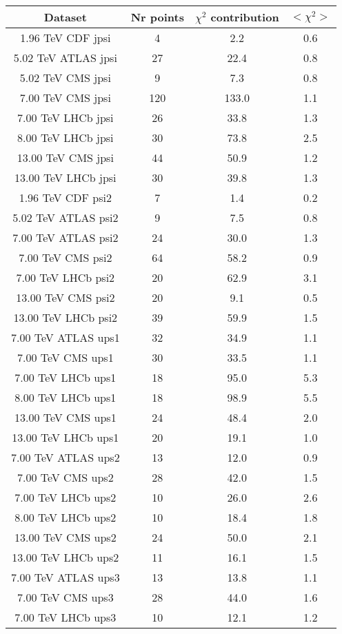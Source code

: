 \begin{table}[h!]
\centering
\begin{tabular}{c|c|c|c}
Dataset & Nr points & $\chi^2$ contribution & $<\chi^2>$ \\
\hline
1.96 TeV CDF jpsi & 4 & 2.2 & 0.6 \\
5.02 TeV ATLAS jpsi & 27 & 22.4 & 0.8 \\
5.02 TeV CMS jpsi & 9 & 7.3 & 0.8 \\
7.00 TeV CMS jpsi & 120 & 133.0 & 1.1 \\
7.00 TeV LHCb jpsi & 26 & 33.8 & 1.3 \\
8.00 TeV LHCb jpsi & 30 & 73.8 & 2.5 \\
13.00 TeV CMS jpsi & 44 & 50.9 & 1.2 \\
13.00 TeV LHCb jpsi & 30 & 39.8 & 1.3 \\
1.96 TeV CDF psi2 & 7 & 1.4 & 0.2 \\
5.02 TeV ATLAS psi2 & 9 & 7.5 & 0.8 \\
7.00 TeV ATLAS psi2 & 24 & 30.0 & 1.3 \\
7.00 TeV CMS psi2 & 64 & 58.2 & 0.9 \\
7.00 TeV LHCb psi2 & 20 & 62.9 & 3.1 \\
13.00 TeV CMS psi2 & 20 & 9.1 & 0.5 \\
13.00 TeV LHCb psi2 & 39 & 59.9 & 1.5 \\
7.00 TeV ATLAS ups1 & 32 & 34.9 & 1.1 \\
7.00 TeV CMS ups1 & 30 & 33.5 & 1.1 \\
7.00 TeV LHCb ups1 & 18 & 95.0 & 5.3 \\
8.00 TeV LHCb ups1 & 18 & 98.9 & 5.5 \\
13.00 TeV CMS ups1 & 24 & 48.4 & 2.0 \\
13.00 TeV LHCb ups1 & 20 & 19.1 & 1.0 \\
7.00 TeV ATLAS ups2 & 13 & 12.0 & 0.9 \\
7.00 TeV CMS ups2 & 28 & 42.0 & 1.5 \\
7.00 TeV LHCb ups2 & 10 & 26.0 & 2.6 \\
8.00 TeV LHCb ups2 & 10 & 18.4 & 1.8 \\
13.00 TeV CMS ups2 & 24 & 50.0 & 2.1 \\
13.00 TeV LHCb ups2 & 11 & 16.1 & 1.5 \\
7.00 TeV ATLAS ups3 & 13 & 13.8 & 1.1 \\
7.00 TeV CMS ups3 & 28 & 44.0 & 1.6 \\
7.00 TeV LHCb ups3 & 10 & 12.1 & 1.2 \\

\end{tabular}
\end{table}
